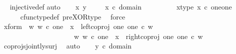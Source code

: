 \begin{isabellebody}
%
\isadelimproof
\ %
\endisadelimproof
%
\isatagproof
{}\isamarkupfalse%
\ injective{\isacharunderscore}{\kern0pt}def\isanewline
{}\isamarkupfalse%
{\isacharparenleft}{\kern0pt}auto{\isacharparenright}{\kern0pt}\isanewline
\ \ \isamarkupfalse%
\ x\ y\ \isanewline
\ \ \isamarkupfalse%
\ {\isachardoublequoteopen}x\ {\isasymin}\isactrlsub c\ domain\ {\isacharparenleft}{\kern0pt}{\isasymlangle}{\isasymt}{\isacharcomma}{\kern0pt}{\isasymf}{\isasymrangle}\ {\isasymamalg}\ {\isasymlangle}{\isasymf}{\isacharcomma}{\kern0pt}{\isasymt}{\isasymrangle}{\isacharparenright}{\kern0pt}{\isachardoublequoteclose}\ \isanewline
\ \ \isamarkupfalse%
\ \isamarkupfalse%
\ x{\isacharunderscore}{\kern0pt}type{\isacharcolon}{\kern0pt}\ {\isachardoublequoteopen}x\ {\isasymin}\isactrlsub c\ one{\isasymCoprod}one{\isachardoublequoteclose}\ \ \isanewline
\ \ \ \ \isamarkupfalse%
\ cfunc{\isacharunderscore}{\kern0pt}type{\isacharunderscore}{\kern0pt}def\ pre{\isacharunderscore}{\kern0pt}XOR{\isacharunderscore}{\kern0pt}type\ \isamarkupfalse%
\ force\isanewline
\ \ \isamarkupfalse%
\ \isamarkupfalse%
\ x{\isacharunderscore}{\kern0pt}form{\isacharcolon}{\kern0pt}\ {\isachardoublequoteopen}{\isacharparenleft}{\kern0pt}{\isasymexists}\ w{\isachardot}{\kern0pt}\ w\ {\isasymin}\isactrlsub c\ one\ {\isasymand}\ x\ {\isacharequal}{\kern0pt}\ left{\isacharunderscore}{\kern0pt}coproj\ one\ one\ {\isasymcirc}\isactrlsub c\ w{\isacharparenright}{\kern0pt}\isanewline
\ \ \ \ \ \ \ \ \ \ \ \ \ \ \ \ \ \ {\isasymor}\ \ {\isacharparenleft}{\kern0pt}{\isasymexists}\ w{\isachardot}{\kern0pt}\ w\ {\isasymin}\isactrlsub c\ one\ {\isasymand}\ x\ {\isacharequal}{\kern0pt}\ right{\isacharunderscore}{\kern0pt}coproj\ one\ one\ {\isasymcirc}\isactrlsub c\ w{\isacharparenright}{\kern0pt}{\isachardoublequoteclose}\isanewline
\ \ \ \ \isamarkupfalse%
\ coprojs{\isacharunderscore}{\kern0pt}jointly{\isacharunderscore}{\kern0pt}surj\ \isamarkupfalse%
\ auto\isanewline
\isanewline
\ \ \isamarkupfalse%
\ {\isachardoublequoteopen}y\ {\isasymin}\isactrlsub c\ domain\ {\isacharparenleft}{\kern0pt}{\isasymlangle}{\isasymt}{\isacharcomma}{\kern0pt}{\isasymf}{\isasymrangle}\ {\isasymamalg}\ {\isasymlangle}{\isasymf}{\isacharcomma}{\kern0pt}{\isasymt}{\isasymrangle}{\isacharparenright}{\kern0pt}{\isachardoublequoteclose}\ \isanewline
\ \ \isamarkupfalse%
\ \isamarkupfalse%

\end{isabellebody}
